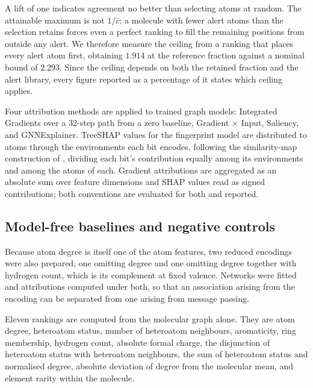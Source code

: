 \documentclass[journal=jcisd8,manuscript=article]{achemso}
\begin{document}
A lift of one indicates agreement no better than selecting atoms at random. The attainable
maximum is not $1/\bar{c}$: a molecule with fewer alert atoms than the selection retains
forces even a perfect ranking to fill the remaining positions from outside any alert. We
therefore measure the ceiling from a ranking that places every alert atom first, obtaining
$1.914$ at the reference fraction against a nominal bound of $2.293$. Since the ceiling
depends on both the retained fraction and the alert library, every figure reported as a
percentage of it states which ceiling applies.

Four attribution methods are applied to trained graph models: Integrated
Gradients\cite{sundararajan2017} over a 32-step path from a zero baseline, Gradient $\times$
Input, Saliency, and GNNExplainer.\cite{ying2019} TreeSHAP values\cite{lundberg2020} for the
fingerprint model are distributed to atoms through the environments each bit encodes,
following the similarity-map construction of \citet{riniker2013},
dividing each bit's contribution equally among its environments and among the atoms of each.
Gradient attributions are aggregated as an absolute sum over feature dimensions and SHAP
values read as signed contributions; both conventions are evaluated for both and reported.

\subsection{Model-free baselines and negative controls}

Because atom degree is itself one of the atom features, two reduced encodings were also
prepared, one omitting degree and one omitting degree together with hydrogen count, which is
its complement at fixed valence. Networks were fitted and attributions computed under both,
so that an association arising from the encoding can be separated from one arising from
message passing.

Eleven rankings are computed from the molecular graph alone. They are atom degree,
heteroatom status, number of heteroatom neighbours, aromaticity, ring membership, hydrogen
count, absolute formal charge, the disjunction of heteroatom status with heteroatom
neighbours, the sum of heteroatom status and normalised degree, absolute deviation of degree
from the molecular mean, and element rarity within the molecule.
\end{document}
